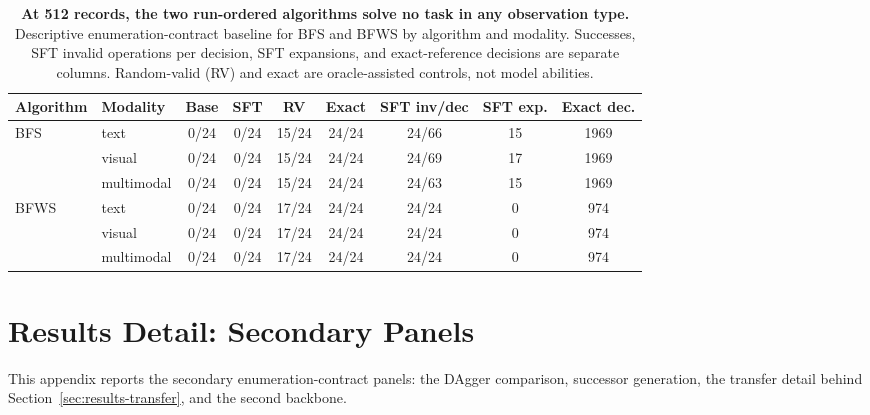 \begin{table}[t]
\caption{\textbf{At 512 records, the two run-ordered algorithms solve no task in any observation type.} Descriptive enumeration-contract baseline for BFS and BFWS by algorithm and modality. Successes, SFT invalid operations per decision, SFT expansions, and exact-reference decisions are separate columns. Random-valid (RV) and exact are oracle-assisted controls, not model abilities.}
\label{tab:results-primary-matrix}
\centering\footnotesize
\setlength{\tabcolsep}{2pt}
\begin{tabular}{@{}ll|cccc|cc|c@{}}
\toprule[0.4mm]
\rowcolor{mygray}\textbf{Algorithm} & \textbf{Modality} & \textbf{Base} & \textbf{SFT} & \textbf{RV} & \textbf{Exact} & \textbf{SFT inv/dec} & \textbf{SFT exp.} & \textbf{Exact dec.} \\
\midrule
\multirow{3}{*}{BFS} & text & 0/24 & 0/24 & 15/24 & 24/24 & 24/66 & 15 & 1969 \\
 & visual & 0/24 & 0/24 & 15/24 & 24/24 & 24/69 & 17 & 1969 \\
 & multimodal & 0/24 & 0/24 & 15/24 & 24/24 & 24/63 & 15 & 1969 \\
\midrule
\multirow{3}{*}{BFWS} & text & 0/24 & 0/24 & 17/24 & 24/24 & 24/24 & 0 & 974 \\
 & visual & 0/24 & 0/24 & 17/24 & 24/24 & 24/24 & 0 & 974 \\
 & multimodal & 0/24 & 0/24 & 17/24 & 24/24 & 24/24 & 0 & 974 \\
\bottomrule
\end{tabular}
\end{table}


\section{Results Detail: Secondary Panels}
\label{app:results-secondary}
\label{sec:results-secondary}

This appendix reports the secondary enumeration-contract panels: the DAgger comparison, successor generation, the transfer detail behind Section~\ref{sec:results-transfer}, and the second backbone.



